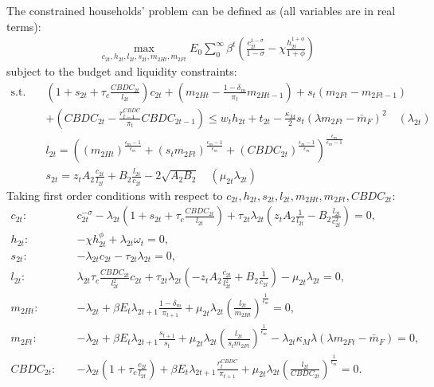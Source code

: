 \documentclass[12pt]{article}
\begin{document}
The constrained households' problem can be defined as (all variables are in real terms):
\begin{align*}
\max_{c_{2t}, h_{2t},l_{2t},s_{2t},m_{2Ht},m_{2Ft}} E_0 \sum_0^{\infty}\beta^t (\frac{c_{2t}^{1-\sigma}}{1-\sigma}-\chi\frac{h_{2t}^{1+\phi}}{1+\phi})
\end{align*}
subject to the budget and liquidity constraints:
\begin{align*} 
\text{s.t.} \quad & (1+s_{2t}+\tau_c\frac{CBDC_{2t}}{l_{2t}})c_{2t}+(m_{2Ht}-\frac{1-\delta_m}{\pi_t}m_{2Ht-1})+s_t(m_{2Ft}-m_{2Ft-1})\\
&+(CBDC_{2t}-\frac{r_{t-1}^{CBDC}}{\pi_t}CBDC_{2t-1})  \leq w_th_{2t}+t_{2t}-\frac{\kappa_M}{2}s_t(\lambda m_{2Ft}-\bar{m}_F)^2  \quad (\lambda_{2t})\\
&l_{2t} = ((m_{2Ht})^{\frac{\epsilon_m-1}{\epsilon_m}}+(s_t m_{2Ft})^{\frac{\epsilon_m-1}{\epsilon_m}}+(CBDC_{2t})^{\frac{\epsilon_m-1}{\epsilon_m}})^{\frac{\epsilon_m}{\epsilon_m-1}} \\
& s_{2t} = z_tA_2\frac{c_{2t}}{l_{2t}}+B_2\frac{l_{2t}}{c_{2t}}-2\sqrt{A_2B_2} \quad (\mu_{2t}\lambda_{2t})
\end{align*}
Taking first order conditions with respect to $c_{2t}, h_{2t}, s_{2t}, l_{2t}, m_{2Ht}, m_{2Ft}, CBDC_{2t}$: 
\begin{align*}
c_{2t}: \quad &c_{2t}^{-\sigma}-\lambda_{2t}(1+s_{2t}+\tau_c\frac{CBDC_{2t}}{l_{2t}})+\tau_{2t}\lambda_{2t}(z_tA_2\frac{1}{l_{2t}}-B_2\frac{l_{2t}}{c_{2t}^2}) = 0, \\
h_{2t}: \quad &-\chi h_{2t}^{\phi}+\lambda_{2t}\omega_t  = 0, \\
s_{2t}: \quad &-\lambda_{2t}c_{2t}-\tau_{2t}\lambda_{2t} = 0, \\
l_{2t}: \quad &\lambda_{2t}\tau_c\frac{CBDC_{2t}}{l_{2t}^2}c_{2t}+\tau_{2t}\lambda_{2t}(-z_tA_2\frac{c_{2t}}{l_{2t}^2}+B_2\frac{1}{c_{2t}})-\mu_{2t}\lambda_{2t} = 0, \\
m_{2Ht}: \quad &-\lambda_{2t}+\beta E_t\lambda_{2t+1}\frac{1-\delta_m}{\pi_{t+1}}+\mu_{2t} \lambda_{2t}(\frac{l_{2t}}{m_{2Ht}})^{\frac{1}{\epsilon_m}}= 0, \\
m_{2Ft}: \quad &-\lambda_{2t}+\beta E_t\lambda_{2t+1}\frac{s_{t+1}}{s_t}+\mu_{2t} \lambda_{2t}(\frac{l_{2t}}{s_tm_{2Ft}})^{\frac{1}{\epsilon_m}}-\lambda_{2t}\kappa_M\lambda(\lambda m_{2Ft}-\bar{m}_F) = 0, \\
CBDC_{2t}: \quad &-\lambda_{2t}(1+\tau_c\frac{c_{2t}}{l_{2t}})+\beta E_t\lambda_{2t+1}\frac{r_{t}^{CBDC}}{\pi_{t+1}}+\mu_{2t} \lambda_{2t}(\frac{l_{2t}}{CBDC_{2t}})^{\frac{1}{\epsilon_m}}= 0.
\end{align*}
\end{document}
